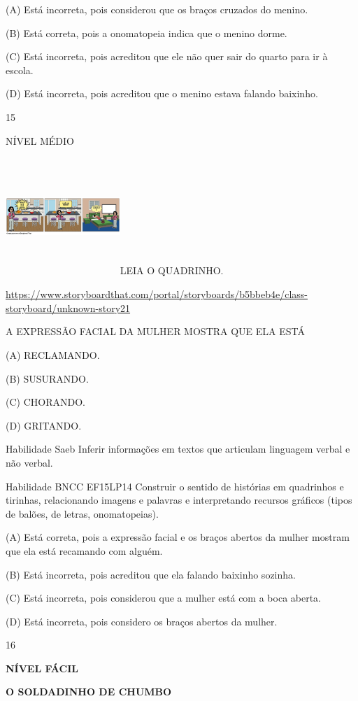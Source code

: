{{(A) Está incorreta, pois considerou que os braços cruzados do menino.

(B) Está correta, pois a onomatopeia indica que o menino dorme.

(C) Está incorreta, pois acreditou que ele não quer sair do quarto para
ir à escola.

(D) Está incorreta, pois acreditou que o menino estava falando baixinho.

\num{15}

NÍVEL MÉDIO

\includegraphics[width=1.70556in,height=1.74444in]{media/image146.png}LEIA
O QUADRINHO.

\url{https://www.storyboardthat.com/portal/storyboards/b5bbeb4e/class-storyboard/unknown-story21}

A EXPRESSÃO FACIAL DA MULHER MOSTRA QUE ELA ESTÁ

(A) RECLAMANDO.

(B) SUSURANDO.

(C) CHORANDO.

(D) GRITANDO.

Habilidade Saeb Inferir informações em textos que articulam linguagem
verbal e não verbal.

Habilidade BNCC EF15LP14 Construir o sentido de histórias em quadrinhos
e tirinhas, relacionando imagens e palavras e interpretando recursos
gráficos (tipos de balões, de letras, onomatopeias).

(A) Está correta, pois a expressão facial e os braços abertos da mulher
mostram que ela está recamando com alguém.

(B) Está incorreta, pois acreditou que ela falando baixinho sozinha.

(C) Está incorreta, pois considerou que a mulher está com a boca aberta.

(D) Está incorreta, pois considero os braços abertos da mulher.

\num{16}

\textbf{NÍVEL FÁCIL}

\textbf{O SOLDADINHO DE CHUMBO}

}}
